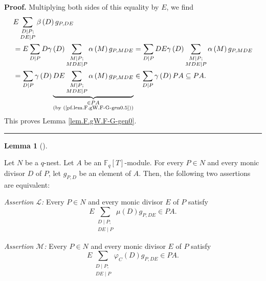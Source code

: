 \documentclass[numbers=enddot,12pt,final,onecolumn,notitlepage]{scrartcl}%
\theoremstyle{definition}
\newtheorem{lem}[theo]{Lemma}
\newenvironment{lemma}[1][]
{\begin{lem}[#1]\begin{leftbar}}
{\end{leftbar}\end{lem}}
\newenvironment{proof}[1][Proof]{\noindent\textbf{#1.} }{\ \rule{0.5em}{0.5em}}
\let\sumnonlimits\sum
\renewcommand{\sum}{\sumnonlimits\limits}
\begin{document}
\begin{proof}
Multiplying both sides of this equality by $E$, we find%
\begin{align*}
&  E\sum_{\substack{D\mid P;\\DE\mid P}}\beta\left(  D\right)  g_{P,DE}\\
&  =E\sum_{D\mid P}D\gamma\left(  D\right)  \sum_{\substack{M\mid P;\\MDE\mid
P}}\alpha\left(  M\right)  g_{P,MDE}=\sum_{D\mid P}DE\gamma\left(  D\right)
\sum_{\substack{M\mid P;\\MDE\mid P}}\alpha\left(  M\right)  g_{P,MDE}\\
&  =\sum_{D\mid P}\gamma\left(  D\right)  \underbrace{DE\sum_{\substack{M\mid
P;\\MDE\mid P}}\alpha\left(  M\right)  g_{P,MDE}}_{\substack{\in PA\\\text{(by
(\ref{pf.lem.F.gW.F-G-gen0.5}))}}}\in\sum_{D\mid P}\gamma\left(  D\right)
PA\subseteq PA.
\end{align*}
This proves Lemma \ref{lem.F.gW.F-G-gen0}.
\end{proof}

\begin{lemma}
\label{lem.F.gW.F-G-gen}Let $N$ be a $q$-nest. Let $A$ be an $\mathbb{F}%
_{q}\left[  T\right]  $-module. For every $P\in N$ and every monic divisor $D$
of $P$, let $g_{P,D}$ be an element of $A$. Then, the following two assertions
are equivalent:

\textit{Assertion }$\mathcal{L}$\textit{:} Every $P\in N$ and every monic
divisor $E$ of $P$ satisfy%
\[
E\sum_{\substack{D\mid P;\\DE\mid P}}\mu\left(  D\right)  g_{P,DE}\in PA.
\]


\textit{Assertion }$\mathcal{M}$\textit{:} Every $P\in N$ and every monic
divisor $E$ of $P$ satisfy%
\[
E\sum_{\substack{D\mid P;\\DE\mid P}}\varphi_{C}\left(  D\right)  g_{P,DE}\in
PA.
\]

\end{lemma}
\end{document}
